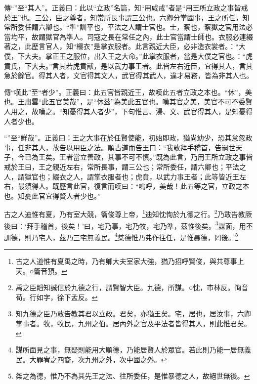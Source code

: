 {\noindent\zhuan{}\fzbyks 傳“”至“其人”。正義曰：此以“立政”名篇，知“用咸戒”者是“用王所立政之事皆戒於王”也。三公，臣之尊者，知常所長事謂三公也。六卿分掌國事，王之所任，知常所委任謂六卿也。“準”訓平也，平法之人謂士官也。士，察也，察獄之官用法必當均平，故謂獄官為準人。司寇之長在常任之內，此士官當謂士師也。衣服必連綴著之，此歷言官人，知“綴衣”是掌衣服者。此言親近大臣，必非造衣裳者。：“大僕，下大夫。掌正王之服位，出入王之大命。”此掌衣服者，當是大僕之官也。：“虎賁氏，下大夫。”言其若虎賁獸，是以武力事王者。此皆左右近臣，宜得其人，言其急於餘官。得其人者，文官得其文人，武官得其武人，違才易務，皆為非其人也。 \par}

{\noindent\zhuan{}\fzbyks 傳“嘆此”至“者少”。正義曰：此五官皆親近王，故嘆此五者立政之本也。“休”，美也。王肅雲“此五官美哉”，是“休茲”為美此五官也。嘆其官之美，美官不可不委賢人用之，故嘆之。“知憂得其人者少”，下句惟言、湯、文、武官得其人，是知憂得人者少也。 \par}

{\noindent\shu{}\fzkt “”至“鮮哉”。正義曰：王之大事在於任賢使能，初始即政，猶尚幼少，恐其怠忽政事，任非其人，故告以用臣之法。順古道而告王曰：“我敢拜手稽首，告嗣世天子，今已為王矣。王者當立善政，其事不可不慎。”既為此言，乃用王所立政之事皆戒於王曰，王之親近左右，常所長事，謂三公也；常所委任，謂六卿也；平法之人，謂獄官也；綴衣之人，謂掌衣服者也；虎賁，以武力事王者；此等皆近王左右，最須得人。既歷言此官，復言而嘆曰：“嗚呼，美哉！此五等之官，立政之本也。知憂此官宜得賢人者少也。” \par}

古之人迪惟有夏，乃有室大競，籥俊尊上帝，\footnote{古之人道惟有夏禹之時，乃有卿大夫室家大強，猶乃招呼賢俊，與共尊事上天。○籥音預。}迪知忱恂於九德之行。\footnote{禹之臣蹈知誠信於九德之行，謂賢智大臣。九德，所謀。○忱，市林反。恂音荀。行如字，徐下孟反。}乃敢告教厥後曰：‘拜手稽首，後矣！’曰，宅乃事，宅乃牧，宅乃準，茲惟後矣。\footnote{知九德之臣乃敢告教其君以立政。君矣，亦猶王矣。宅，居也，居汝事，六卿掌事者。牧，牧民，九州之伯。居內外之官及平法者皆得其人，則此惟君矣。}謀面，用丕訓德，則乃宅人，茲乃三宅無義民。\footnote{謀所面見之事，無疑則能用大順德，乃能居賢人於眾官。若此則乃能一居無義民。大罪宥之四裔，次九州之外，次中國之外。}桀德惟乃弗作往任，是惟暴德，罔後。\footnote{桀之為德，惟乃不為其先王之法、往所委任，是惟暴德之人，故絕世無後。}


